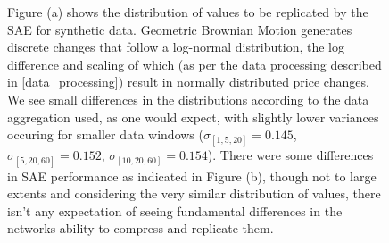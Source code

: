 \documentclass[a4paper,11pt,oneside]{article}
\theoremstyle{plain}
\theoremstyle{definition}
\begin{document}
\begin{figure}[H]
{		\newline Figure (a) shows the distribution of values to be replicated by the SAE for synthetic data. Geometric Brownian Motion generates discrete changes that follow a log-normal distribution, the log difference and scaling of which (as per the data processing described in \ref{data_processing}) result in normally distributed price changes. We see small differences in the distributions according to the data aggregation used, as one would expect, with slightly lower variances occuring for smaller data windows ($\sigma_{[1,5,20]} = 0.145$, $\sigma_{[5,20,60]} = 0.152$, $\sigma_{[10,20,60]} = 0.154$). There were some differences in SAE performance as indicated in Figure (b), though not to large extents and considering the very similar distribution of values, there isn't any expectation of seeing fundamental differences in the networks ability to compress and replicate them. }
	\label{figure-data_sae_synthetic}
\end{figure}
\end{document}
